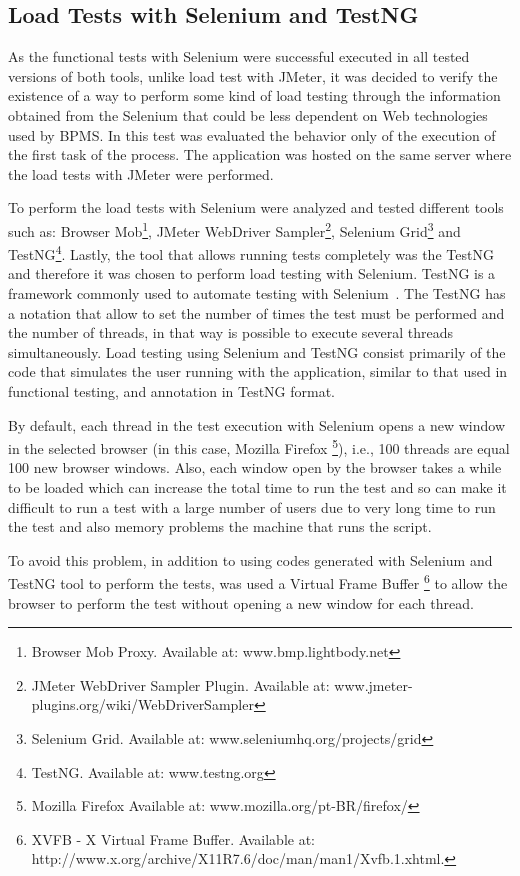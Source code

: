 \documentclass[runningheads,a4paper]{llncs}
\begin{document}
\subsection{Load Tests with Selenium and TestNG}
As the functional tests with Selenium were successful executed in all tested versions of both tools, unlike load test with JMeter, it was decided to verify the existence of a way to perform some kind of load testing through the information obtained from the Selenium that could be less dependent on Web technologies used by BPMS. In this test was evaluated the behavior only of the execution of the first task of the process. The application was hosted on the same server where the load tests with JMeter were performed.

To perform the load tests with Selenium were analyzed and tested different tools such as: Browser Mob\footnote{Browser Mob Proxy. Available at: www.bmp.lightbody.net}, JMeter WebDriver Sampler\footnote{JMeter WebDriver Sampler Plugin. Available at: www.jmeter-plugins.org/wiki/WebDriverSampler}, Selenium Grid\footnote{Selenium Grid. Available at: www.seleniumhq.org/projects/grid} and TestNG\footnote{TestNG. Available at: www.testng.org}. Lastly, the tool that allows running tests completely was the TestNG and therefore it was chosen to perform load testing with Selenium. TestNG is a framework commonly used to automate testing with Selenium~\cite{bindal2014test}. The TestNG has a notation that allow to set the number of times the test must be performed and the number of threads, in that way is possible to execute several threads simultaneously. Load testing using Selenium and TestNG consist primarily of the code that simulates the user running with the application, similar to that used in functional testing, and annotation in TestNG format.

By default, each thread in the test execution with Selenium opens a new window in the selected browser (in this case, Mozilla Firefox \footnote{Mozilla Firefox Available at: www.mozilla.org/pt-BR/firefox/}), i.e., 100 threads are equal 100 new browser windows. Also, each window open by the browser takes a while to be loaded which can increase the total time to run the test and so can make it difficult to run a test with a large number of users due to very long time to run the test and also memory problems the machine that runs the script.

To avoid this problem, in addition to using codes generated with Selenium and TestNG tool to perform the tests, was used a Virtual Frame Buffer \footnote{XVFB - X Virtual Frame Buffer. Available at: http://www.x.org/archive/X11R7.6/doc/man/man1/Xvfb.1.xhtml.} to allow the browser to perform the test without opening a new window for each thread.
\end{document}
